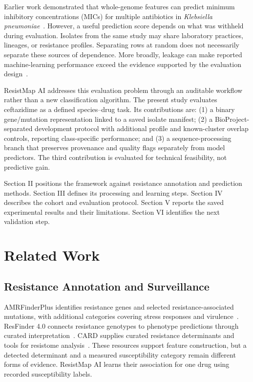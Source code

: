 \documentclass[conference]{IEEEtran}
\newcommand{\kp}{\textit{Klebsiella pneumoniae}}
\begin{document}
Earlier work demonstrated that whole-genome features can predict minimum inhibitory concentrations (MICs) for multiple antibiotics in \kp{}~\cite{nguyen}. However, a useful prediction score depends on what was withheld during evaluation. Isolates from the same study may share laboratory practices, lineages, or resistance profiles. Separating rows at random does not necessarily separate these sources of dependence. More broadly, leakage can make reported machine-learning performance exceed the evidence supported by the evaluation design~\cite{leakage}.

ResistMap AI addresses this evaluation problem through an auditable workflow rather than a new classification algorithm. The present study evaluates ceftazidime as a defined species--drug task. Its contributions are: (1) a binary gene/mutation representation linked to a saved isolate manifest; (2) a BioProject-separated development protocol with additional profile and known-cluster overlap controls, reporting class-specific performance; and (3) a sequence-processing branch that preserves provenance and quality flags separately from model predictors. The third contribution is evaluated for technical feasibility, not predictive gain.

Section II positions the framework against resistance annotation and prediction methods. Section III defines its processing and learning steps. Section IV describes the cohort and evaluation protocol. Section V reports the saved experimental results and their limitations. Section VI identifies the next validation step.

\section{Related Work}
\subsection{Resistance Annotation and Surveillance}
AMRFinderPlus identifies resistance genes and selected resistance-associated mutations, with additional categories covering stress responses and virulence~\cite{amrfinder}. ResFinder 4.0 connects resistance genotypes to phenotype predictions through curated interpretation~\cite{resfinder}. CARD supplies curated resistance determinants and tools for resistome analysis~\cite{card}. These resources support feature construction, but a detected determinant and a measured susceptibility category remain different forms of evidence. ResistMap AI learns their association for one drug using recorded susceptibility labels.
\end{document}

